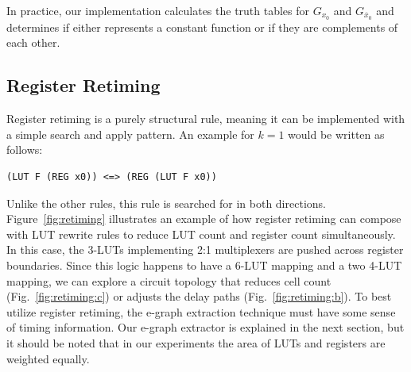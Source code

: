 In practice, our implementation calculates the truth tables for $G_{x_0}$ and
$G_{\overline{x}_0}$ and determines if either represents a constant function or
if they are complements of each other.

\subsection{Register Retiming}\label{sec:rewrites:retiming}

Register retiming is a purely structural rule, meaning it can be implemented
with a simple search and apply pattern. An example for $k=1$ would be written
as follows:

\begin{lstlisting}
(LUT F (REG x0)) <=> (REG (LUT F x0))
\end{lstlisting}

Unlike the other rules, this rule is searched for in both directions.
Figure~\ref{fig:retiming} illustrates an example of how register retiming can
compose with LUT rewrite rules to reduce LUT count and register count
simultaneously. In this case, the 3-LUTs implementing 2:1 multiplexers are
pushed across register boundaries. Since this logic happens to have a 6-LUT
mapping and a two 4-LUT mapping, we can explore a circuit topology that reduces
cell count (Fig.~\ref{fig:retiming:c}) or adjusts the delay paths
(Fig.~\ref{fig:retiming:b}). To best utilize register retiming, the e-graph
extraction technique must have some sense of timing information. Our e-graph
extractor is explained in the next section, but it should be noted that in our
experiments the area of LUTs and registers are weighted equally.
